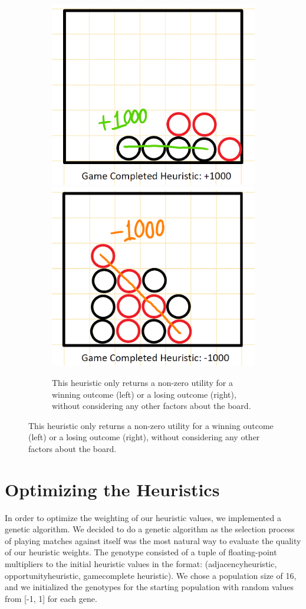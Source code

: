 \documentclass{article}
\begin{document}
\begin{figure}[htb]
    \centering
    \begin{subfigure}[b]{\textwidth}
        \centering
        \includegraphics[width=0.45\linewidth]{Writeup/win-util-1.jpg}%
        \hfill
        \includegraphics[width=0.45\linewidth]{Writeup/win-util-2.jpg}
        \captionsetup{labelformat=empty}
        \caption{This heuristic only returns a non-zero utility for a winning outcome (left) or a losing outcome (right), without considering any other factors about the board.}
    \end{subfigure}
\end{figure}

\section{Optimizing the Heuristics}
In order to optimize the weighting of our heuristic values, we implemented a genetic algorithm. We decided to do a genetic algorithm as the selection process of playing matches against itself was the most natural way to evaluate the quality of our heuristic weights. The genotype consisted of a tuple of floating-point multipliers to the initial heuristic values in the format: (adjacency\textunderscore heuristic, opportunity\textunderscore heuristic, game\textunderscore complete heuristic). We chose a population size of 16, and we initialized the genotypes for the starting population with random values from [-1, 1] for each gene.
\end{document}
